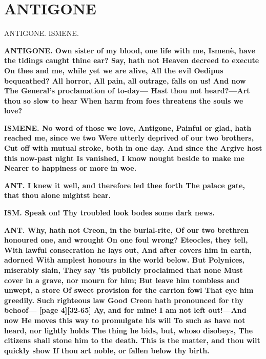 \documentclass[11pt,letter]{book}
\begin{document}
\par  [page 3]
\section{ANTIGONE}
\par  ANTIGONE. ISMENE.

\par \textbf{ANTIGONE. Own sister of my blood, one life with me, Ismenè, have the tidings caught thine ear? Say, hath not Heaven decreed to execute On thee and me, while yet we are alive, All the evil Oedipus bequeathed? All horror, All pain, all outrage, falls on us! And now The General’s proclamation of to-day— Hast thou not heard?—Art thou so slow to hear When harm from foes threatens the souls we love?}
\par 

\par \textbf{ISMENE. No word of those we love, Antigone, Painful or glad, hath reached me, since we two Were utterly deprived of our two brothers, Cut off with mutual stroke, both in one day. And since the Argive host this now-past night Is vanished, I know nought beside to make me Nearer to happiness or more in woe.}
\par 

\par \textbf{ANT. I knew it well, and therefore led thee forth The palace gate, that thou alone mightst hear.}
\par 

\par \textbf{ISM. Speak on! Thy troubled look bodes some dark news.}
\par 

\par \textbf{ANT. Why, hath not Creon, in the burial-rite, Of our two brethren honoured one, and wrought On one foul wrong? Eteocles, they tell, With lawful consecration he lays out, And after covers him in earth, adorned With amplest honours in the world below. But Polynices, miserably slain, They say ’tis publicly proclaimed that none Must cover in a grave, nor mourn for him; But leave him tombless and unwept, a store Of sweet provision for the carrion fowl That eye him greedily. Such righteous law Good Creon hath pronounced for thy behoof— [page 4][32-65] Ay, and for mine! I am not left out!—And now He moves this way to promulgate his will To such as have not heard, nor lightly holds The thing he bids, but, whoso disobeys, The citizens shall stone him to the death. This is the matter, and thou wilt quickly show If thou art noble, or fallen below thy birth.}
\par 
\end{document}

